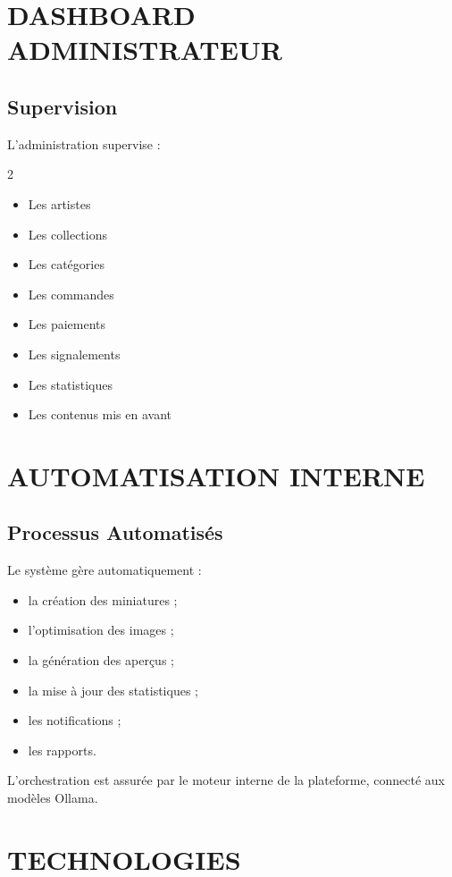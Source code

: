 \documentclass[12pt,a4paper,oneside]{book}
\begin{document}
\chapter{DASHBOARD ADMINISTRATEUR}

\section{Supervision}
L'administration supervise :
\begin{multicols}{2}
\begin{itemize}
\item Les artistes
\item Les collections
\item Les catégories
\item Les commandes
\item Les paiements
\item Les signalements
\item Les statistiques
\item Les contenus mis en avant
\end{itemize}
\end{multicols}

\chapter{AUTOMATISATION INTERNE}

\section{Processus Automatisés}
Le système gère automatiquement :
\begin{itemize}
\item la création des miniatures ;
\item l'optimisation des images ;
\item la génération des aperçus ;
\item la mise à jour des statistiques ;
\item les notifications ;
\item les rapports.
\end{itemize}

L'orchestration est assurée par le moteur interne de la plateforme, connecté aux modèles Ollama.

\chapter{TECHNOLOGIES}
\end{document}
